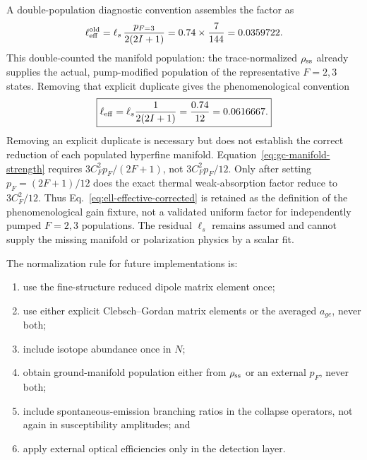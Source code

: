 \documentclass[11pt,a4paper]{article}
\begin{document}
A double-population diagnostic convention assembles the factor as
\begin{equation}
\ell_{\rm eff}^{\rm old}
=\ell_s\,\frac{p_{F=3}}{2(2I+1)}
=0.74\times\frac{7}{144}
=0.0359722 .
\label{eq:ell-effective}
\end{equation}
This double-counted the manifold population: the trace-normalized
$\rho_{\rm ss}$ already supplies the actual, pump-modified population of the
representative $F=2,3$ states. Removing that explicit duplicate gives the phenomenological convention
\begin{equation}
\boxed{\ell_{\rm eff}=\ell_s\frac{1}{2(2I+1)}
=\frac{0.74}{12}=0.0616667 .}
\label{eq:ell-effective-corrected}
\end{equation}
Removing an explicit duplicate is necessary but does not establish the
correct reduction of each populated hyperfine manifold. Equation~\eqref{eq:gc-manifold-strength}
requires $3C_F^2p_F/(2F+1)$, not $3C_F^2p_F/12$. Only after setting
$p_F=(2F+1)/12$ does the exact thermal weak-absorption factor reduce to
$3C_F^2/12$. Thus Eq.~\eqref{eq:ell-effective-corrected} is retained as the
definition of the phenomenological gain fixture, not a validated uniform
factor for independently pumped $F=2,3$ populations. The residual $\ell_s$
remains assumed and cannot supply the missing manifold or polarization
physics by a scalar fit.

The normalization rule for future implementations is:
\begin{enumerate}
\item use the fine-structure reduced dipole matrix element once;
\item use either explicit Clebsch--Gordan matrix elements or the averaged
$a_{ge}$, never both;
\item include isotope abundance once in $N$;
\item obtain ground-manifold population either from $\rho_{\rm ss}$ or an
external $p_F$, never both;
\item include spontaneous-emission branching ratios in the collapse
operators, not again in susceptibility amplitudes; and
\item apply external optical efficiencies only in the detection layer.
\end{enumerate}
\end{document}
